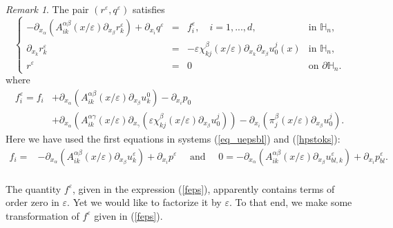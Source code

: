 \documentclass[11pt, reqno]{amsart}
\theoremstyle{definition}
\theoremstyle{remark}
\newtheorem{remark}[theorem]{Remark}
\numberwithin{equation}{section}
\begin{document}
	
	\begin{remark}
		The pair $(r^\varepsilon,q^\varepsilon)$ satisfies
		\begin{equation}\label{rqeps}
			\left\{
			\begin{array}{rcll}
				-\partial_{x_\alpha} ( A^{\alpha\beta}_{ik}(x/\varepsilon)\partial_{x_\beta}  r_k^\varepsilon) + \partial_{x_i} q^\varepsilon&=&  f_i^\varepsilon  , \quad i=1,...,d, &\mbox{in } \mathbb{H}_n,\,\\
				\partial_{x_k} r_k^\varepsilon&=& - \varepsilon \chi^{\beta}_{kj}(x/\varepsilon)\partial_{x_k}\partial_{ x_{\beta}}  u^j_0   (x)   &\mbox{in } {\mathbb{H}}_n,\\
				r^\varepsilon &=& 0\quad & \mbox{on } \partial{\mathbb{H}}_n.
			\end{array}
			\right. 
		\end{equation}
		where
		\begin{align}\label{feps}
			f_i^\varepsilon
			= f_i&	+\partial_{x_\alpha} \left( A^{\alpha\beta}_{ik}(x/\varepsilon)\partial_{x_\beta}	\! u_k^0   \right)- \partial_{x_i}  p_0 \nonumber\\
			& 	+\partial_{x_\alpha} \left( A^{\alpha\gamma}_{ik}(x/\varepsilon)\partial_{x_\gamma}	\! ( \varepsilon\chi^{\beta}_{kj}(x/\varepsilon)\partial_{ x_{\beta}}  u^j_0  ) \right)- \partial_{x_i} \left( \pi^{\beta}_{j}(x/\varepsilon)\partial_{ x_{\beta}}  u^j_0 \right).
		\end{align}
		Here we have used 	the first equations in  systems \textup{(\ref{eq_uepsbl})} and \textup{(\ref{hpstoks})}:
		\begin{align*}
			f_i 
			= & 	-\partial_{x_\alpha} ( A^{\alpha\beta}_{ik}(x/\varepsilon)\partial_{x_\beta}	u_k^\varepsilon ) + \partial_{x_i} p^\varepsilon \quad
			\mbox{  and }\quad
			0
			= 	 -\partial_{x_\alpha} (A^{\alpha\beta}_{ik}(x/\varepsilon)\partial_{x_\beta}	\!  u^\varepsilon_{bl,k})  +  \partial_{x_i} p^\varepsilon_{bl}.\nonumber\\
		\end{align*}		
		
	\end{remark}
	\noindent	The quantity $f^\varepsilon$, given in the expression (\ref{feps}), apparently contains terms of order zero in $\varepsilon$. Yet 
	we would like to factorize it by $\varepsilon$. To that end, we make some transformation of $f^\varepsilon$ given in (\ref{feps}).
	
\end{document}
